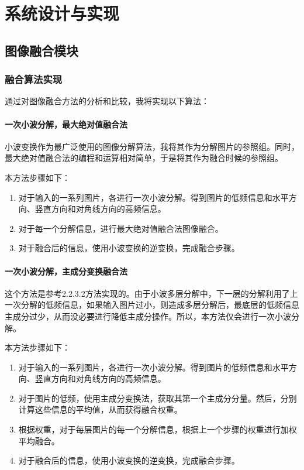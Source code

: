 \documentclass{xduugthesis}
\begin{document}
\chapter{系统设计与实现}
\section{图像融合模块}
\subsection{融合算法实现}
通过对图像融合方法的分析和比较，我将实现以下算法：
\subsubsection{一次小波分解，最大绝对值融合法}
小波变换作为最广泛使用的图像分解算法，我将其作为分解图片的参照组。同时，最大绝对值融合法的编程和运算相对简单，于是将其作为融合时候的参照组。\par
本方法步骤如下：
\begin{enumerate}
	\item 对于输入的一系列图片，各进行一次小波分解。得到图片的低频信息和水平方向、竖直方向和对角线方向的高频信息。
	\item 对于每一个分解信息，进行最大绝对值融合法图像融合。
	\item 对于融合后的信息，使用小波变换的逆变换，完成融合步骤。
\end{enumerate}
\subsubsection{一次小波分解，主成分变换融合法}
这个方法是参考2.2.3.2方法实现的。由于小波多层分解中，下一层的分解利用了上一次分解的低频信息，如果输入图片过小，则造成多层分解后，最底层的低频信息主成分过少，从而没必要进行降低主成分操作。所以，本方法仅会进行一次小波分解。\par
本方法步骤如下：
\begin{enumerate}
	\item 对于输入的一系列图片，各进行一次小波分解。得到图片的低频信息和水平方向、竖直方向和对角线方向的高频信息。
	\item 对于图片的低频，使用主成分变换法，获取其第一个主成分分量。然后，分别计算这些信息的平均值，从而获得融合权重。
	\item 根据权重，对于每层图片的每一个分解信息，根据上一个步骤的权重进行加权平均融合。
	\item 对于融合后的信息，使用小波变换的逆变换，完成融合步骤。
\end{enumerate}
\end{document}
